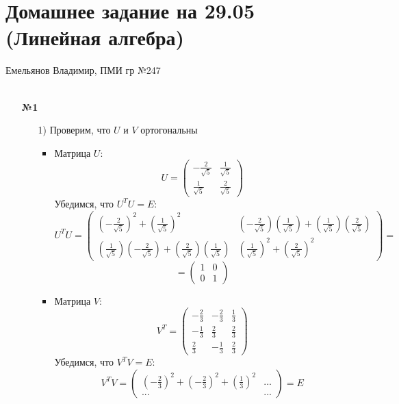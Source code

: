 \documentclass[a4paper]{article}
\begin{document}
\section*{Домашнее задание на 29.05 (Линейная алгебра)}
{\large Емельянов Владимир, ПМИ гр №247}\\\\
\begin{enumerate}
  \item[\textbf{№1}]\begin{enumerate}
    \item[1)]Проверим, что $U$ и $V$ ортогональны
    \begin{itemize}
      \item Матрица \( U \):
     \[
     U = \begin{pmatrix}
     -\frac{2}{\sqrt{5}} & \frac{1}{\sqrt{5}} \\
     \frac{1}{\sqrt{5}} & \frac{2}{\sqrt{5}}
     \end{pmatrix}
     \]
     Убедимся, что \( U^T U = E \):
     \[
     U^T U = \begin{pmatrix}
     \left(-\frac{2}{\sqrt{5}}\right)^2 + \left(\frac{1}{\sqrt{5}}\right)^2 & \left(-\frac{2}{\sqrt{5}}\right)\left(\frac{1}{\sqrt{5}}\right) + \left(\frac{1}{\sqrt{5}}\right)\left(\frac{2}{\sqrt{5}}\right) \\
     \left(\frac{1}{\sqrt{5}}\right)\left(-\frac{2}{\sqrt{5}}\right) + \left(\frac{2}{\sqrt{5}}\right)\left(\frac{1}{\sqrt{5}}\right) & \left(\frac{1}{\sqrt{5}}\right)^2 + \left(\frac{2}{\sqrt{5}}\right)^2
     \end{pmatrix}= \]
     \[= \begin{pmatrix}
     1 & 0 \\
     0 & 1
     \end{pmatrix}
     \]

     \item Матрица \( V \):
     \[
     V^T = \begin{pmatrix}
     -\frac{2}{3} & -\frac{2}{3} & \frac{1}{3} \\
     -\frac{1}{3} & \frac{2}{3} & \frac{2}{3} \\
     \frac{2}{3} & -\frac{1}{3} & \frac{2}{3}
     \end{pmatrix}
     \]
     Убедимся, что \( V^T V = E \):
     \[
     V^T V = \begin{pmatrix}
     \left(-\frac{2}{3}\right)^2 + \left(-\frac{2}{3}\right)^2 + \left(\frac{1}{3}\right)^2 & \text{...} \\
     \text{...} & \text{...}
     \end{pmatrix} = E
     \]\\
    \end{itemize}


\end{enumerate}
\end{enumerate}
\end{document}

